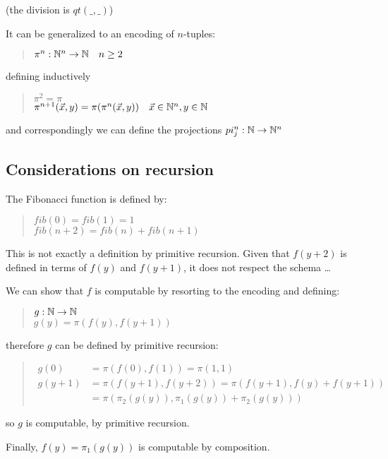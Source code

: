 (the division is $qt(\_,\_)$)

It can be generalized to an encoding of $n$-tuples:
\begin{quote}
  $\pi^n: \mathbb{N}^n\rightarrow\mathbb{N} \quad n\geq2$
\end{quote}
defining inductively
\begin{quote}
  $\pi^2 = \pi$\\
  $\pi^{n+1}(\vec{x},y) = \pi(\pi^n(\vec{x},y)) \quad \vec{x} \in \mathbb{N}^n, y \in \mathbb{N}$
\end{quote}

and correspondingly we can define the projections $pi_j^n:\mathbb{N}\rightarrow\mathbb{N}^n$

\subsection{Considerations on recursion}

The Fibonacci function is defined by:

\begin{quote}
  $ fib(0) = fib(1) = 1$\\
  $fib(n+2) = fib(n) + fib(n+1)$
\end{quote}

This is not exactly a definition by primitive recursion. Given that $f(y+2)$ is defined in terms of $f(y)$ and $f(y+1)$, it does not respect the schema \dots

We can show that $f$ is computable by resorting to the encoding and defining:

\begin{quote}
  $g:\mathbb{N}\rightarrow\mathbb{N}$\\
  $g(y) = \pi(f(y),f(y+1))$\\
\end{quote}

therefore $g$ can be defined by primitive recursion:

\begin{quote}
  $\begin{array}{ll}
     g(0) & =  \pi(f(0),f(1)) = \pi(1,1)\\[2mm]
     g(y+1)  & = \pi(f(y+1),f(y+2)) = \pi(f(y+1),f(y)+f(y+1))\\
              & = \pi(\pi_2(g(y)), \pi_1(g(y)) + \pi_2(g(y)))
   \end{array}
   $
\end{quote}
so $g$ is computable, by primitive recursion.

Finally, $f(y) = \pi_1(g(y))$ is computable by composition.

